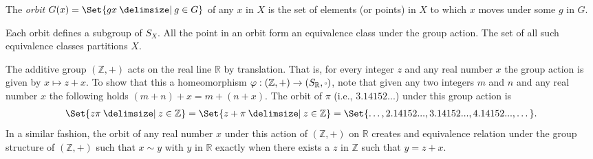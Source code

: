 \begin{definition}
The \emph{orbit} $G(x) = \Set{gx  \given g \in G}$ of any $x$ in $X$ is
the set of elements (or points) in $X$ to which $x$ moves under some $g$ in $G$.
\end{definition}

Each orbit defines a subgroup of $S_X$.  All the point in an orbit form an equivalence
class under the group action.  The set of all such equivalence classes partitions $X$.

\begin{example}
The additive group $(\mathbb{Z}, +)$ acts on the real line $\mathbb{R}$ by translation.
That is, for every integer $z$ and any real number $x$ the group action is given
by $x \mapsto z + x$. To show that this a homeomorphism $\varphi : (\mathbb{Z}, +) \to (S_\mathbb{R}, \smallcirc)$,
note that given any two integers $m$ and $n$ and any real number $x$ the following
holds $(m + n) + x = m + (n + x)$.  The orbit of $\pi$ (i.e., $3.14152...$) under
this group action is
\begin{align*}
\Set{z\pi  \given z \in \mathbb{Z}} = \Set{z + \pi  \given z \in \mathbb{Z}} =\Set{\dots, 2.14152..., 3.14152..., 4.14152..., \dots}.
\end{align*}
In a similar fashion, the orbit of any real number $x$ under this action of $(\mathbb{Z}, +)$
on $\mathbb{R}$ creates and equivalence relation under the group structure of $(\mathbb{Z}, +)$ such
that $x \sim y$ with $y$ in $\mathbb{R}$ exactly when there exists a $z$ in $\mathbb{Z}$ such that
$y = z + x$.
\end{example}

